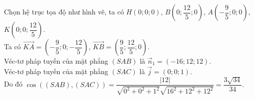 \begin{ex}
{{
		}
\noindent	Chọn hệ trục tọa độ như hình vẽ, ta có $ H(0;0;0) $, $ B\left( 0;\dfrac{12}{5};0\right)  $, $ A\left( -\dfrac{9}{5};0;0 \right)  $, $ K\left( 0;0;\dfrac{12}{5} \right)  $.\\	Ta có 
		$ \vec{KA}=\left( -\dfrac{9}{5};0;-\dfrac{12}{5} \right)  $, $ \vec{KB}=\left( \dfrac{9}{5};\dfrac{12}{5};0 \right)  $.\\
		Véc-tơ pháp tuyến của mặt phẳng $ (SAB) $ là $ \vec{n}_1=\left( -16;12;12 \right) $.\\
		Véc-tơ pháp tuyến của mặt phẳng $ (SAC) $ là $ \vec{j}=(0;0;1) $.\\
		Do đó $ \cos((SAB),(SAC))=\dfrac{|12|}{\sqrt{0^2+0^2+1^2}\sqrt{16^2+12^2+12^2}}=\dfrac{3\sqrt{34}}{34}. $
	}
\end{ex}
